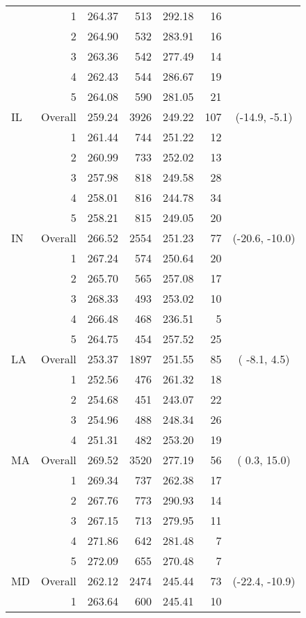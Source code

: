 \begin{longtable}{lrrr@{\extracolsep{.25cm}}rrc}
   & 1 & 264.37 & 513 & 292.18 &  16 &  \\ 
   & 2 & 264.90 & 532 & 283.91 &  16 &  \\ 
   & 3 & 263.36 & 542 & 277.49 &  14 &  \\ 
   & 4 & 262.43 & 544 & 286.67 &  19 &  \\ 
   & 5 & 264.08 & 590 & 281.05 &  21 &  \\ 
   \hline
IL & Overall & 259.24 & 3926 & 249.22 & 107 & (-14.9,  -5.1) \\ 
   & 1 & 261.44 & 744 & 251.22 &  12 &  \\ 
   & 2 & 260.99 & 733 & 252.02 &  13 &  \\ 
   & 3 & 257.98 & 818 & 249.58 &  28 &  \\ 
   & 4 & 258.01 & 816 & 244.78 &  34 &  \\ 
   & 5 & 258.21 & 815 & 249.05 &  20 &  \\ 
   \hline
IN & Overall & 266.52 & 2554 & 251.23 &  77 & (-20.6, -10.0) \\ 
   & 1 & 267.24 & 574 & 250.64 &  20 &  \\ 
   & 2 & 265.70 & 565 & 257.08 &  17 &  \\ 
   & 3 & 268.33 & 493 & 253.02 &  10 &  \\ 
   & 4 & 266.48 & 468 & 236.51 &   5 &  \\ 
   & 5 & 264.75 & 454 & 257.52 &  25 &  \\ 
   \hline
LA & Overall & 253.37 & 1897 & 251.55 &  85 & ( -8.1,   4.5) \\ 
   & 1 & 252.56 & 476 & 261.32 &  18 &  \\ 
   & 2 & 254.68 & 451 & 243.07 &  22 &  \\ 
   & 3 & 254.96 & 488 & 248.34 &  26 &  \\ 
   & 4 & 251.31 & 482 & 253.20 &  19 &  \\ 
   \hline
MA & Overall & 269.52 & 3520 & 277.19 &  56 & (  0.3,  15.0) \\ 
   & 1 & 269.34 & 737 & 262.38 &  17 &  \\ 
   & 2 & 267.76 & 773 & 290.93 &  14 &  \\ 
   & 3 & 267.15 & 713 & 279.95 &  11 &  \\ 
   & 4 & 271.86 & 642 & 281.48 &   7 &  \\ 
   & 5 & 272.09 & 655 & 270.48 &   7 &  \\ 
   \hline
MD & Overall & 262.12 & 2474 & 245.44 &  73 & (-22.4, -10.9) \\ 
   & 1 & 263.64 & 600 & 245.41 &  10 &  \\ 

\end{longtable}
